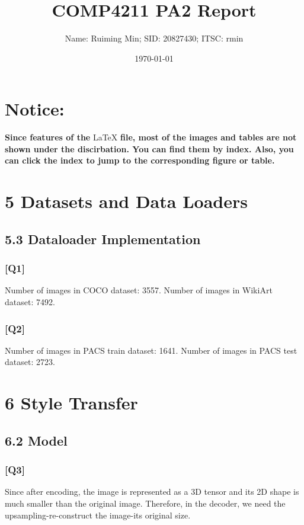 \documentclass{article}
\title{COMP4211 PA2 Report}
\author{Name: Ruiming Min; SID: 20827430; ITSC: rmin}
\date{\today}
\begin{document}
    
\maketitle

\section*{Notice:}
\textbf{Since features of the} \LaTeX \textbf{ file, most of the images and tables are not shown under the discirbation. You can find them by index. Also, you can click the index to jump to the corresponding figure or table.}

\section*{5 Datasets and Data Loaders}

\subsection*{5.3 Dataloader Implementation}

\subsubsection*{[Q1]}
Number of images in COCO dataset: 3557.
Number of images in WikiArt dataset: 7492.

\subsubsection*{[Q2]}
Number of images in PACS train dataset: 1641.
Number of images in PACS test dataset: 2723.

\newpage

\section*{6 Style Transfer}

\subsection*{6.2 Model}

\subsubsection*{[Q3]}
Since after encoding, the image is represented as a 3D tensor and its 2D shape is much smaller than the original image. 
Therefore, in the decoder, we need the upsampling-re-construct the image-its original size.
\end{document}
